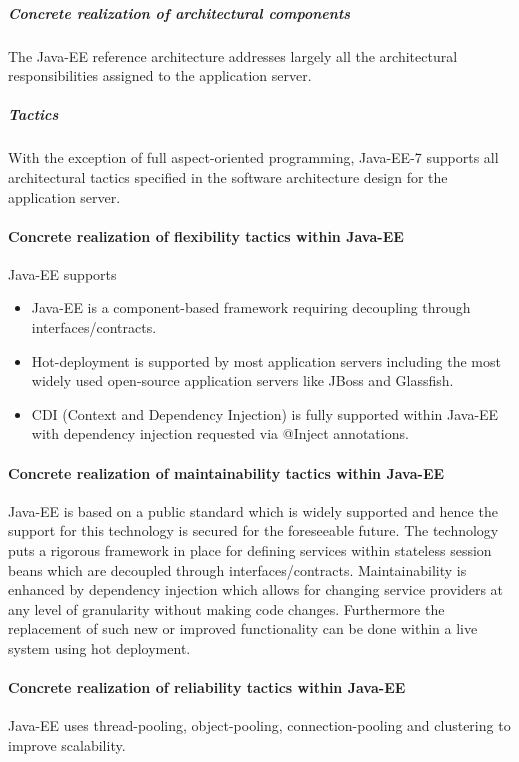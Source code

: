 \documentclass[a4paper,12pt]{report}
\begin{document}
				\subparagraph {Concrete realization of architectural components}
				\hfill \break
				The Java-EE reference architecture addresses largely all the architectural responsibilities assigned to the application server.
				
				\subparagraph {Tactics}
				\hfill \break
				With the exception of full aspect-oriented programming, Java-EE-7 supports all architectural tactics specified in the software architecture design for the application server.
				
			\paragraph {Concrete realization of flexibility tactics  within Java-EE}
			\hfill \break
			Java-EE supports
				\begin {itemize}
					\item Java-EE is a component-based framework requiring decoupling through interfaces/contracts.
					\item Hot-deployment is supported by most application servers including the most widely used
			open-source application servers like JBoss and Glassfish.
					\item CDI (Context and Dependency Injection) is fully supported within Java-EE with dependency
			injection requested via @Inject annotations.
				\end {itemize}
			
			\paragraph {Concrete realization of maintainability tactics  within Java-EE}
			Java-EE is based on a public standard which is widely supported and hence the support for this technology is secured for the foreseeable future. The technology puts a rigorous framework in place for defining services within stateless session beans which are decoupled through interfaces/contracts. Maintainability is enhanced by dependency injection which allows for changing service providers at any level of granularity without making code changes. Furthermore the replacement of such new
			or improved functionality can be done within a live system using hot deployment.
			
			\paragraph {Concrete realization of reliability tactics  within Java-EE}
			\hfill \break
			Java-EE uses thread-pooling, object-pooling, connection-pooling and clustering to improve scalability.
\end{document}
